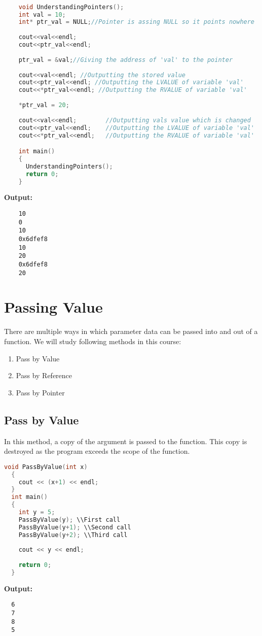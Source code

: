 \documentclass[11pt,fleqn]{book} %
\begin{document}
\begin{example}
  \begin{lstlisting}[language=C++, caption = Understanding Pointers]

    void UnderstandingPointers();
    int val = 10;
    int* ptr_val = NULL;//Pointer is assing NULL so it points nowhere
    
    cout<<val<<endl;
    cout<<ptr_val<<endl;
    
    ptr_val = &val;//Giving the address of 'val' to the pointer
    
    cout<<val<<endl; //Outputting the stored value
    cout<<ptr_val<<endl; //Outputting the LVALUE of variable 'val'
    cout<<*ptr_val<<endl; //Outputting the RVALUE of variable 'val'
    
    *ptr_val = 20;
    
    cout<<val<<endl;        //Outputting vals value which is changed 
    cout<<ptr_val<<endl;    //Outputting the LVALUE of variable 'val'
    cout<<*ptr_val<<endl;   //Outputting the RVALUE of variable 'val'

    int main()
    {
      UnderstandingPointers();
      return 0;
    }
  \end{lstlisting} 
  \textbf{Output:}
  \begin{lstlisting}
    10
    0
    10
    0x6dfef8
    10
    20
    0x6dfef8
    20
  \end{lstlisting}

\end{example}

\section{Passing Value}
There are multiple ways in which parameter data can be passed into and out of a function. We will study following methods in this course:
\begin{enumerate}
\item Pass by Value
\item Pass by Reference
\item Pass by Pointer
\end{enumerate}
\subsection{Pass by Value}
In this method, a copy of the argument is passed to the function. This copy is destroyed as the program exceeds the scope of the function.
\begin{lstlisting}[language=C++, caption = Pass by value]
  void PassByValue(int x)
  {
    cout << (x+1) << endl;
  }
  int main()
  {
    int y = 5;
    PassByValue(y); \\First call
    PassByValue(y+1); \\Second call
    PassByValue(y+2); \\Third call
    
    cout << y << endl;
    
    return 0;
  }
\end{lstlisting}
\textbf{Output:}
\begin{lstlisting}
  6
  7
  8
  5
\end{lstlisting}
\end{document}
